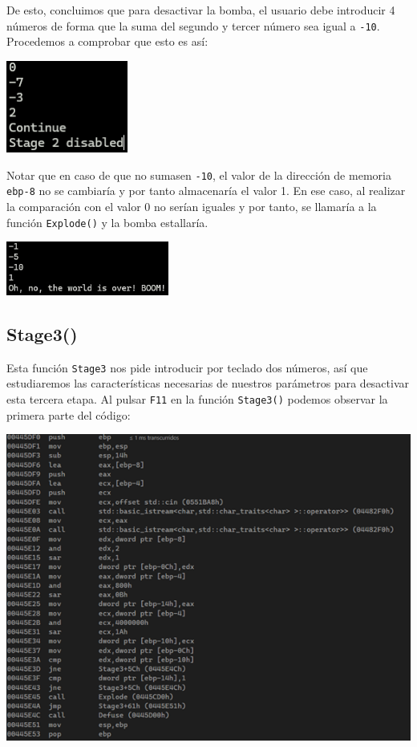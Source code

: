\documentclass[11pt,a4paper]{article}
\begin{document}
De esto, concluimos que para desactivar la bomba, el usuario debe introducir 4 números
de forma que la suma del segundo y tercer número sea igual a \texttt{-10}. Procedemos a comprobar 
que esto es así:
\begin{center}
  \includegraphics[width=0.3\textwidth]{Stage 2/Stage2Correcto.png}
\end{center}

Notar que en caso de que no sumasen \texttt{-10}, el valor de la dirección de memoria \texttt{ebp-8} no se cambiaría 
y por tanto almacenaría el valor 1. En ese caso, al realizar la comparación con el valor 0 no serían iguales y por 
tanto, se llamaría a la función \texttt{Explode()} y la bomba estallaría.

\vspace{2mm}
\begin{center}
  \includegraphics[width=0.4\textwidth]{Stage 2/explode.png}
\end{center}

\newpage
\subsection{Stage3()}
Esta función \texttt{Stage3} nos pide introducir por teclado dos números, así que estudiaremos las características
necesarias de nuestros parámetros para desactivar esta tercera etapa. Al pulsar \texttt{F11} en la función
\texttt{Stage3()} podemos observar la primera parte del código:
\begin{center}
  \includegraphics[width=\textwidth]{Stage3/img1.png}
\end{center}
\end{document}
